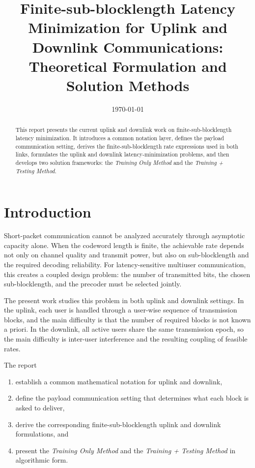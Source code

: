 \documentclass[11pt]{article}
\title{Finite-sub-blocklength Latency Minimization for Uplink and Downlink Communications:\\Theoretical Formulation and Solution Methods}
\author{}
\date{\today}
\begin{document}
\maketitle

\begin{abstract}
This report presents the current uplink and downlink
work on finite-sub-blocklength latency minimization. It introduces a common
notation layer, defines the payload communication setting, derives the
finite-sub-blocklength rate expressions used in both links, formulates the uplink
and downlink latency-minimization problems, and then develops two solution
frameworks: the \emph{Training Only Method} and the \emph{Training + Testing
Method}. 
\end{abstract}

\section{Introduction}

Short-packet communication cannot be analyzed accurately through asymptotic
capacity alone. When the codeword length is finite, the achievable rate depends
not only on channel quality and transmit power, but also on sub-blocklength and the
required decoding reliability. For latency-sensitive multiuser communication,
this creates a coupled design problem: the number of transmitted bits, the
chosen sub-blocklength, and the precoder must be selected jointly.

The present work studies this problem in both uplink and downlink settings. In
the uplink, each user is handled through a user-wise sequence of transmission
blocks, and the main difficulty is that the number of required blocks is not
known a priori. In the downlink, all active users share the same transmission
epoch, so the main difficulty is inter-user interference and the resulting
coupling of feasible rates.

The report
\begin{enumerate}
    \item establish a common mathematical notation for uplink and downlink,
    \item define the payload communication setting that determines what each block is asked to deliver,
    \item derive the corresponding finite-sub-blocklength uplink and downlink formulations, and
    \item present the \emph{Training Only Method} and the \emph{Training + Testing Method} in algorithmic form.
\end{enumerate}
\end{document}
